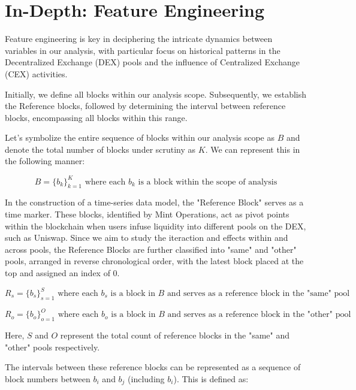 \documentclass{article}
\begin{document}
\section{\textbf{In-Depth: Feature Engineering}}

Feature engineering is key in deciphering the intricate dynamics between variables in our analysis, with particular focus on historical patterns in the Decentralized Exchange (DEX) pools and the influence of Centralized Exchange (CEX) activities.

Initially, we define all blocks within our analysis scope. Subsequently, we establish the Reference blocks, followed by determining the interval between reference blocks, encompassing all blocks within this range.

Let's symbolize the entire sequence of blocks within our analysis scope as $B$ and denote the total number of blocks under scrutiny as $K$. We can represent this in the following manner:

\begin{equation}
B = \{b_k\}_{k=1}^{K} \text{ where each } b_k \text{ is a block within the scope of analysis}
\end{equation}

In the construction of a time-series data model, the "Reference Block" serves as a time marker. These blocks, identified by Mint Operations, act as pivot points within the blockchain when users infuse liquidity into different pools on the DEX, such as Uniswap. Since we aim to study the iteraction and effects within and across pools, the Reference Blocks are further classified into "same" and "other" pools, arranged in reverse chronological order, with the latest block placed at the top and assigned an index of 0.

\begin{equation}
R_{s} = \{b_{s}\}_{s=1}^{S} \text{ where each } b_{s} \text{ is a block in } B \text{ and serves as a reference block in the "same" pool}
\end{equation}

\begin{equation}
R_{o} = \{b_{o}\}_{o=1}^{O} \text{ where each } b_{o} \text{ is a block in } B \text{ and serves as a reference block in the "other" pool}
\end{equation}

Here, $S$ and $O$ represent the total count of reference blocks in the "same" and "other" pools respectively.

The intervals between these reference blocks can be represented as a sequence of block numbers between $b_i$ and $b_j$ (including $b_i$). This is defined as:
\end{document}
